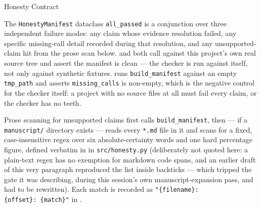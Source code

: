 \documentclass[
  ignorenonframetext,
]{beamer}
\newcounter{none} %
\begin{document}
\begin{frame}{Honesty Contract}
\begin{block}{The \texttt{HonestyManifest} dataclass}
\texttt{all\_passed} is a conjunction over three independent failure
modes: any claim whose evidence resolution failed, any specific
missing-call detail recorded during that resolution, and any
unsupported-claim hit from the prose scan below.
 and
 both call
 against this project's own real
source tree and assert the manifest is clean --- the checker is run
against itself, not only against synthetic fixtures.
 runs
\texttt{build\_manifest} against an empty \texttt{tmp\_path} and asserts
\texttt{missing\_calls} is non-empty, which is the negative control for
the checker itself: a project with no source files at all must fail
every claim, or the checker has no teeth.
\end{block}

\begin{block}{Prose scanning for unsupported claims}
\protect{}\label{prose-scanning-for-unsupported-claims}
 first
calls \texttt{build\_manifest}, then --- if a \texttt{manuscript/}
directory exists --- reads every \texttt{*.md} file in it and scans for
a fixed, case-insensitive regex over six absolute-certainty words and
one hard percentage figure, defined verbatim in
 in \texttt{src/honesty.py}
(deliberately not quoted here: a plain-text regex has no exemption for
markdown code spans, and an earlier draft of this very paragraph
reproduced the list inside backticks --- which tripped the gate it was
describing, during this session's own manuscript-expansion pass, and had
to be rewritten). Each match is recorded as
\texttt{"\{filename\}:\{offset\}:\ \textquotesingle{}\{match\}\textquotesingle{}"}
in .


\end{block}
\end{frame}
\end{document}
